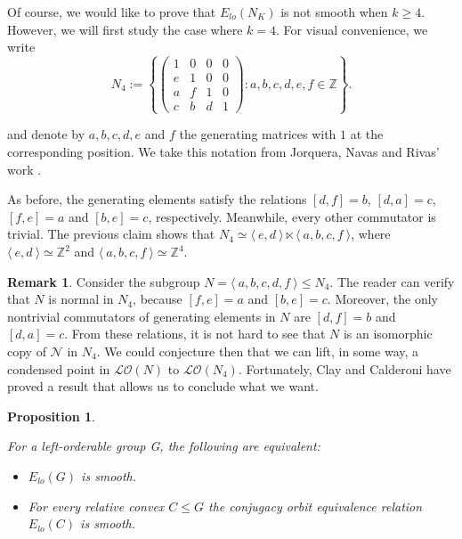 \documentclass[12pt]{article}
\newtheorem{prop}{Proposition}
\theoremstyle{definition}
\newtheorem{rem}{Remark}
\begin{document}
Of course, we would like to prove that $E_{lo}(N_K)$ is not smooth when $k\geq 4$. However, we will first study the case where $k=4$. For visual convenience, we write
$$N_4:=\left \{  \left (
        \begin{array}{cccc}
            1 & 0 & 0 & 0 \\
            e & 1 & 0 & 0 \\
            a & f & 1 & 0 \\
            c & b & d & 1 
        \end{array}
        \right )
        :  a,b,c,d,e,f \in \mathbb{Z} 
        \right \}.$$

and denote by $a,b,c,d,e$ and $f$ the generating matrices with $1$ at the corresponding position. We take this notation from Jorquera, Navas and Rivas' work \cite{Rivas}.

As before, the generating elements satisfy the relations $[d,f]=b$, $[d,a]=c$, $[f,e]=a$ and $[b,e]=c$, respectively. Meanwhile, every other commutator is trivial. The previous claim shows that $N_4\simeq \langle\ e,d\ \rangle \ltimes \langle\ a,b,c,f\ \rangle$, where $\langle\ e,d\ \rangle\simeq \mathbb{Z}^2$ and $\langle\ a,b,c,f\ \rangle\simeq \mathbb{Z}^4$.

\begin{rem}
Consider the subgroup $N=\langle\ a,b,c,d,f\ \rangle\leq N_4$.
The reader can verify that $N$ is normal in $N_4$, because $[f,e]=a$ and $[b,e]=c$.  Moreover, the only nontrivial commutators of generating elements in $N$ are $[d,f]=b$ and $[d,a]=c$. From these relations, it is not hard to see that $N$ is an isomorphic copy of $\mathcal{N}$ in $N_4$. We could conjecture then that we can lift, in some way, a condensed point in $\mathcal{LO}(N)$ to $\mathcal{LO}(N_4)$. Fortunately, Clay and Calderoni have proved a result that allows us to conclude what we want.
\end{rem}

\begin{prop} \cite[Corollary 3.4]{ClayCalderoni3}
{\it For a left-orderable group G, the following are equivalent:
\label{Convex}
\begin{itemize}
    \item[(1)] $E_{lo}(G)$ is smooth.
    \item[(2)] For every relative convex $C\leq G$ the conjugacy orbit equivalence relation $E_{lo}(C)$ is smooth.
\end{itemize} }    
\end{prop}
\end{document}
